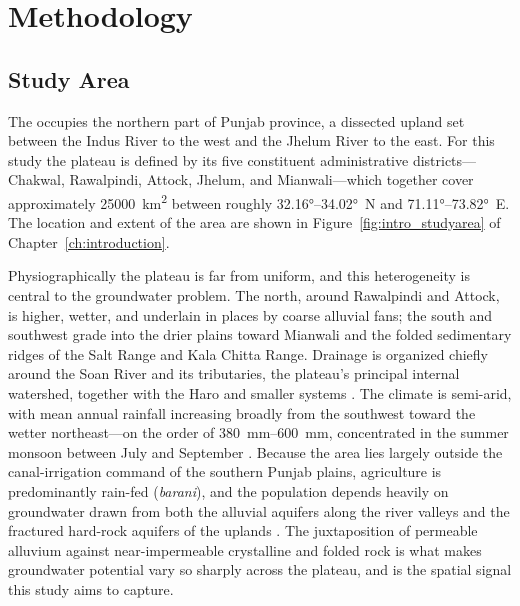 \chapter{Methodology}
\label{ch:methodology}

\section{Study Area}
\label{sec:study_area}

The \studyarea{} occupies the northern part of Punjab province, a dissected
upland set between the Indus River to the west and the Jhelum River to the east.
For this study the plateau is defined by its five constituent administrative
districts---Chakwal, Rawalpindi, Attock, Jhelum, and Mianwali---which together
cover approximately \SI{25000}{\kilo\meter\squared} between roughly
\ang{32.16}--\ang{34.02}~N and \ang{71.11}--\ang{73.82}~E. The location and
extent of the area are shown in Figure~\ref{fig:intro_studyarea} of
Chapter~\ref{ch:introduction}.

Physiographically the plateau is far from uniform, and this heterogeneity is
central to the groundwater problem. The north, around Rawalpindi and Attock, is
higher, wetter, and underlain in places by coarse alluvial fans; the south and
southwest grade into the drier plains toward Mianwali and the folded sedimentary
ridges of the Salt Range and Kala Chitta Range. Drainage is organized chiefly
around the Soan River and its tributaries, the plateau's principal internal
watershed, together with the Haro and smaller systems
\cite{sarwar2022soandrought}. The climate is semi-arid, with mean annual
rainfall increasing broadly from the southwest toward the wetter northeast---on
the order of \SIrange{380}{600}{\milli\meter}, concentrated in the summer monsoon
between July and September \cite{hafeez2025rwh}. Because the area lies largely
outside the canal-irrigation command of the southern Punjab plains, agriculture
is predominantly rain-fed (\emph{barani}), and the population depends heavily on
groundwater drawn from both the alluvial aquifers along the river valleys and the
fractured hard-rock aquifers of the uplands \cite{waqas2022chakwal}. The
juxtaposition of permeable alluvium against near-impermeable crystalline and
folded rock is what makes groundwater potential vary so sharply across the
plateau, and is the spatial signal this study aims to capture.

